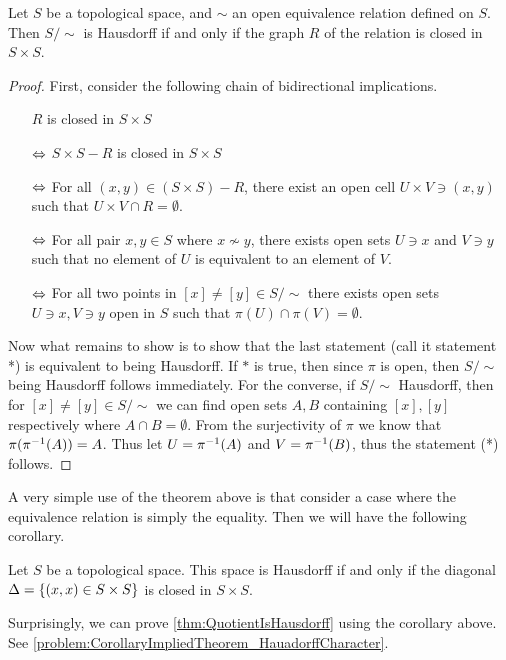 \begin{theorem}
	\label{thm:QuotientIsHausdorff}
	Let $ S $ be a topological space, and $ \sim $ an open equivalence relation defined on $ S $. Then $ S/\sim $ is Hausdorff if and only if the graph $ R $ of the relation is closed in $ S\times S $.
\end{theorem}
\begin{proof}
	First, consider the following chain of bidirectional implications.
	
	\begin{itemize}[noitemsep]
		\item [] $ R $ is closed in $ S\times S $
		\item [$ \Leftrightarrow $] $ S\times S - R $ is closed in $ S\times S $
		\item [$ \Leftrightarrow $] For all $ (x,y) \in (S\times S) - R $, there exist an open cell $ U\times V \ni (x,y) $ such that $ U\times V \cap R = \emptyset $.
		\item [$ \Leftrightarrow $] For all pair $ x,y \in S $ where $ x\not\sim y $, there exists open sets $ U\ni x $ and $ V \ni y $ such that no element of $ U $ is equivalent to an element of $ V $. 
		\item [$ \Leftrightarrow $] For all two points in $ [x]\neq [y] \in S/\sim $ there exists open sets $ U\ni x,V \ni y $ open in $ S $ such that $ \pi(U) \cap \pi(V)  = \emptyset $. 
	\end{itemize}
		Now what remains to show is to show that the last statement (call it statement *) is equivalent to being Hausdorff. If $ * $ is true, then since $ \pi $ is open, then $ S/\sim $ being Hausdorff follows immediately. For the converse, if $ S/\sim $ Hausdorff, then for $ [x]\neq [y] \in S/\sim $ we can find open sets $ A,B $ containing $ [x],[y] $ respectively where $ A \cap B = \emptyset $. From the surjectivity of $ \pi $  we know that $ \pi(\pi^{-1}(A)) = A $. Thus let $ U = \pi^{-1}(A) $ and $ V = \pi^{-1}(B) $, thus the statement (*) follows.
\end{proof}

A very simple use of the theorem above is that consider a case where the equivalence relation is simply the equality. Then we will have the following corollary.

\begin{corollary}
	\label{coro:HuasdorffCarachterization}
	Let $ S $ be a topological space. This space is Hausdorff if and only if the diagonal $ \Delta = \{(x,x) \in S\times S\} $ is closed in $ S\times S $.
\end{corollary}
\begin{remark}
	Surprisingly, we can prove \autoref{thm:QuotientIsHausdorff} using the corollary above. See \autoref{problem:CorollaryImpliedTheorem_HauadorffCharacter}.
\end{remark}

